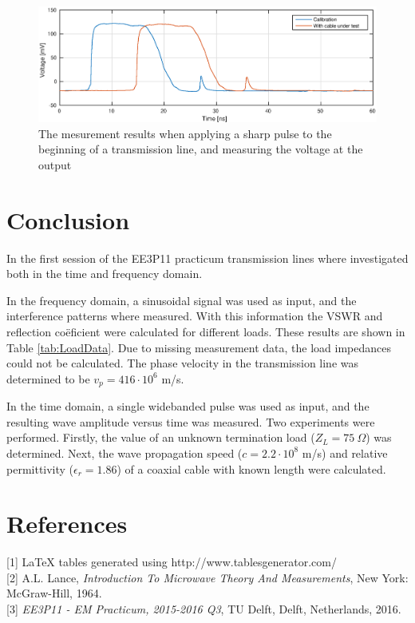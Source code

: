\documentclass[11pt,a4paper]{article}
\begin{document}
\begin{figure}
\includegraphics[width=\textwidth]{assignment2bResults.eps}
\caption{The mesurement results when applying a sharp pulse to the beginning of a transmission line, and measuring the voltage at the output}\label{fig:part2bResults}
\end{figure}

\section{Conclusion}
In the first session of the EE3P11 practicum transmission lines where investigated both in the time and frequency domain.

In the frequency domain, a sinusoidal signal was used as input, and the interference patterns where measured.
With this information the VSWR and reflection co\"eficient were calculated for different loads. These results are shown in Table \ref{tab:LoadData}.
Due to missing measurement data, the load impedances could not be calculated.
The phase velocity in the transmission line was determined to be $v_p = 416 \cdot 10^6$ m/s.

In the time domain, a single widebanded pulse was used as input, and the resulting wave amplitude versus time was measured.
Two experiments were performed.
Firstly, the value of an unknown termination load ($Z_L = 75 \ \Omega$) was determined.
Next, the wave propagation speed ($c = 2.2 \cdot 10^8$ m/s) and relative permittivity ($\epsilon_r = 1.86$) of a coaxial cable with known length were calculated.

\section{References}
[1]  LaTeX tables generated using http://www.tablesgenerator.com/\\
{[2]} A.L. Lance, \textit{Introduction To Microwave Theory And Measurements}, New York: McGraw-Hill, 1964.\\
{[3]} \textit{EE3P11 - EM Practicum, 2015-2016 Q3}, TU Delft, Delft, Netherlands, 2016.
\end{document}
